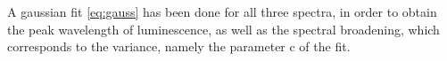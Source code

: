 A gaussian fit \ref{eq:gauss} has been done for all three spectra, in order to obtain the peak wavelength of luminescence, as well as the spectral broadening, which corresponds to the variance, namely the parameter c of the fit.




